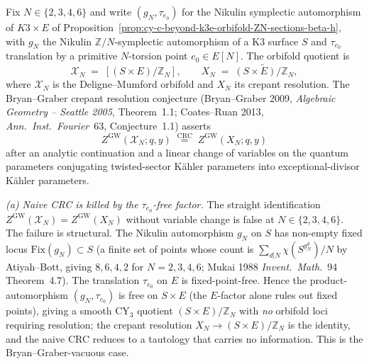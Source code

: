 \begin{remark}[Crepant resolution for \texorpdfstring{$(K3\times E)/\mathbb Z_N$}{(K3x E)/Z-N} orbifolds and the categorical shadow of \texorpdfstring{$\kappa_{\mathrm{BKM}}(\Phi_N)=c_N(0)/2$}{kappa-BKM(Phi-N)=c-N(0)/2}]
\label{rem:cy-c-beyond-k3e-crepant-resolution-ZN-BOP2019-kappa-BKM-shadow}
Fix $N\in\{2,3,4,6\}$ and write $(g_N,\tau_{e_0})$ for the Nikulin
symplectic automorphism of $K3\times E$ of
Proposition~\ref{prop:cy-c-beyond-k3e-orbifold-ZN-sections-beta-h},
with $g_N$ the Nikulin $\mathbb Z/N$-symplectic automorphism of a K3
surface $S$ and $\tau_{e_0}$ translation by a primitive $N$-torsion
point $e_0\in E[N]$. The orbifold quotient is
\[
 \mathcal X_N \;=\; [(S\times E)/\mathbb Z_N],
 \qquad
 X_N \;=\; \widetilde{(S\times E)/\mathbb Z_N},
\]
where $\mathcal X_N$ is the Deligne--Mumford orbifold and $X_N$ its
crepant resolution. The Bryan--Graber crepant resolution conjecture
(Bryan--Graber 2009, \emph{Algebraic Geometry -- Seattle 2005},
Theorem~1.1; Coates--Ruan 2013, \emph{Ann.\ Inst.\ Fourier}~63,
Conjecture~1.1) asserts
\[
 Z^{\mathrm{GW}}(\mathcal X_N;q,y)
 \;\overset{\mathrm{CRC}}{=}\;
 Z^{\mathrm{GW}}(X_N;q,y)
\]
after an analytic continuation and a linear change of variables on
the quantum parameters conjugating twisted-sector K\"ahler parameters
into exceptional-divisor K\"ahler parameters.

\emph{\textup{(a)} Naive CRC is killed by the $\tau_{e_0}$-free
factor.} The straight identification
$Z^{\mathrm{GW}}(\mathcal X_N)=Z^{\mathrm{GW}}(X_N)$ without variable
change is false at $N\in\{2,3,4,6\}$. The failure is structural. The
Nikulin automorphism $g_N$ on $S$ has non-empty fixed locus
$\mathrm{Fix}(g_N)\subset S$ (a finite set of points whose count is
$\sum_{d|N}\chi(S^{g_N^d})/N$ by Atiyah--Bott, giving $8,6,4,2$ for
$N=2,3,4,6$; Mukai 1988 \emph{Invent.\ Math.}~94 Theorem~4.7). The
translation $\tau_{e_0}$ on $E$ is fixed-point-free. Hence the
product-automorphism $(g_N,\tau_{e_0})$ is free on $S\times E$ (the
$E$-factor alone rules out fixed points), giving a smooth CY$_3$
quotient $(S\times E)/\mathbb Z_N$ with \emph{no} orbifold loci
requiring resolution; the crepant resolution $X_N\to(S\times E)/\mathbb
Z_N$ is the identity, and the naive CRC reduces to a tautology that
carries no information. This is the Bryan--Graber-vacuous case.


\end{remark}
